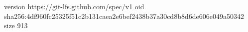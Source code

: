 version https://git-lfs.github.com/spec/v1
oid sha256:4df960fc25325f51c2b131caea2e6bef2438b37a30cd8b8d6de606e049a50342
size 913
